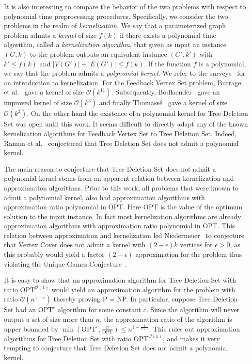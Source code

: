 \documentclass[a4paper,11pt]{article}
\newcommand{\Oh}{{\mathcal{O}}}
\begin{document}
It is also interesting to compare the behavior of the two problems with respect to polynomial time preprocessing procedures. Specifically, we consider the two problems in the realm of {\em kernelization}. We say that a parameterized graph problem admits a {\em kernel} of size $f(k)$ if there exists a polynomial time algorithm, called a {\em kernelization algorithm}, that given as input an instance $(G,k)$ to the problem outputs an equivalent instance $(G',k')$ with $k' \leq f(k)$ and $|V(G')| + |E(G')| \leq f(k)$. If the function $f$ is a polynomial, we say that the problem admits a {\em polynomial kernel}. We refer to the surveys~\cite{GN07,LokshtanovMS12} for an introduction to kernelization. For the {\sc Feedback Vertex Set} problem, Burrage et al.~\cite{BurrageEFLMR06} gave a kernel of size $\Oh(k^{11})$. Subsequently, Bodlaender~\cite{Bodlaender07} gave an improved kernel of size $\Oh(k^3)$  and finally Thomass\'{e}~\cite{Thomasse10} gave a kernel of size $\Oh(k^2)$. On the other hand the existence of a polynomial kernel for {\sc Tree Deletion Set} was open until this work. It seems difficult to directly adapt any of the known kernelization algorithms for {\sc Feedback Vertex Set} to {\sc Tree Deletion Set}. Indeed, Raman et al.~\cite{RamanSS13} conjectured that {\sc Tree Deletion Set} does not admit a polynomial kernel. 

The main reason to conjecture that {\sc Tree Deletion Set} does not admit a polynomial kernel stems from an apparent relation between kernelization and approximation algorithms. Prior to this work, all problems that were known to admit a polynomial kernel, also had approximation algorithms with approximation ratio polynomial in OPT. Here OPT is the value of the optimum solution to the input instance. In fact most kernelization algorithms are already approximation algorithms  with approximation ratio polynomial in OPT. This relation between approximation and kernelization led Niedermeier~\cite{rolf_invitation} to conjecture that {\sc Vertex Cover} does not admit a kernel with $(2-\epsilon)k$ vertices for $\epsilon > 0$, as this probably would yield a factor $(2-\epsilon)$ approximation for the problem thus violating the Unique Games Conjecture~\cite{KhotR08}. 

It is easy to show that an approximation algorithm for {\sc Tree Deletion Set} with ratio $\text{OPT}^{\Oh(1)}$ would yield an approximation algorithm for the problem with ratio $\Oh(n^{1-\epsilon})$ thereby proving {\sf P} = {\sf NP}. In particular, suppose {\sc Tree Deletion Set} had an $\text{OPT}^{c}$ algorithm for some constant $c$. Since the algorithm will never output a set of size more than $n$, the approximation ratio of the algorithm is upper bounded by $\min(\text{OPT}^c, \frac{n}{\text{OPT}}) \leq n^{1-\frac{1}{c+1}}$. This rules out approximation algorithms for  {\sc Tree Deletion Set} with ratio $\text{OPT}^{\Oh(1)}$, and makes it very tempting to conjecture that  {\sc Tree Deletion Set} does not admit a polynomial kernel. 
\end{document}
